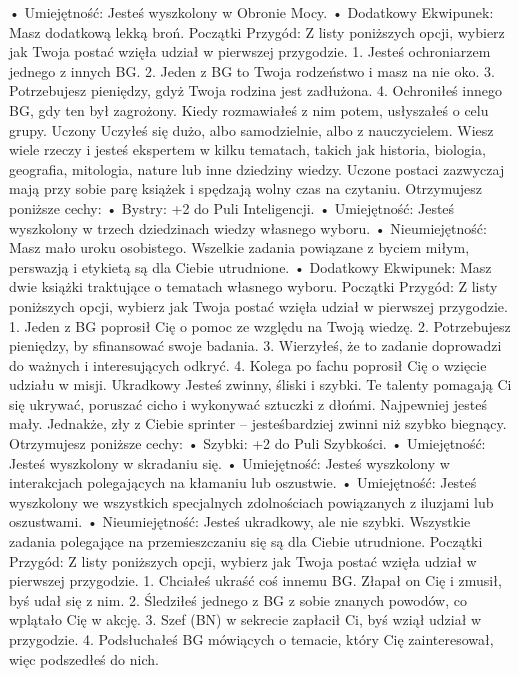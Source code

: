     • Umiejętność: Jesteś wyszkolony w Obronie Mocy.
    • Dodatkowy Ekwipunek: Masz dodatkową lekką broń.
Początki Przygód: Z listy poniższych opcji, wybierz jak Twoja postać wzięła udział w pierwszej przygodzie.
1. Jesteś ochroniarzem jednego z innych BG.
2. Jeden z BG to Twoja rodzeństwo i masz na nie oko.
3. Potrzebujesz pieniędzy, gdyż Twoja rodzina jest zadłużona.
4. Ochroniłeś innego BG, gdy ten był zagrożony. Kiedy rozmawiałeś z nim potem, usłyszałeś o celu grupy. 
Uczony
Uczyłeś się dużo, albo samodzielnie, albo z nauczycielem. Wiesz wiele rzeczy i jesteś ekspertem w kilku tematach, takich jak historia, biologia, geografia, mitologia, nature lub inne dziedziny wiedzy. Uczone postaci zazwyczaj mają przy sobie parę książek i spędzają wolny czas na czytaniu.
Otrzymujesz poniższe cechy:
    • Bystry: +2 do Puli Inteligencji.
    • Umiejętność: Jesteś wyszkolony w trzech dziedzinach wiedzy własnego wyboru.
    • Nieumiejętność: Masz mało uroku osobistego. Wszelkie zadania powiązane z byciem miłym, perswazją i etykietą są dla Ciebie utrudnione.
    • Dodatkowy Ekwipunek: Masz dwie książki traktujące o tematach własnego wyboru.
Początki Przygód: Z listy poniższych opcji, wybierz jak Twoja postać wzięła udział w pierwszej przygodzie.
1. Jeden z BG poprosił Cię o pomoc ze względu na Twoją wiedzę.
2. Potrzebujesz pieniędzy, by sfinansować swoje badania.
3. Wierzyłeś, że to zadanie doprowadzi do ważnych i interesujących odkryć.
4. Kolega po fachu poprosił Cię o wzięcie udziału w misji.
Ukradkowy
Jesteś zwinny, śliski i szybki. Te talenty pomagają Ci się ukrywać, poruszać cicho i wykonywać sztuczki z dłońmi. Najpewniej jesteś mały. Jednakże, zły z Ciebie sprinter – jesteśbardziej zwinni niż szybko biegnący.
Otrzymujesz poniższe cechy:
    • Szybki: +2 do Puli Szybkości.
    • Umiejętność: Jesteś wyszkolony w skradaniu się.
    • Umiejętność: Jesteś wyszkolony w interakcjach polegających na kłamaniu lub oszustwie.
    • Umiejętność: Jesteś wyszkolony we wszystkich specjalnych zdolnościach powiązanych z iluzjami lub oszustwami.
    • Nieumiejętność:  Jesteś ukradkowy, ale nie szybki. Wszystkie zadania polegające na przemieszczaniu się są dla Ciebie utrudnione. 
Początki Przygód: Z listy poniższych opcji, wybierz jak Twoja postać wzięła udział w pierwszej przygodzie.
1. Chciałeś ukraść coś innemu BG. Złapał on Cię i zmusił, byś udał się z nim.
2. Śledziłeś jednego z BG z sobie znanych powodów, co wplątało Cię w akcję.
3. Szef (BN) w sekrecie zapłacił Ci, byś wziął udział w przygodzie.
4. Podsłuchałeś BG mówiących o temacie, który Cię zainteresował, więc podszedłeś do nich.
